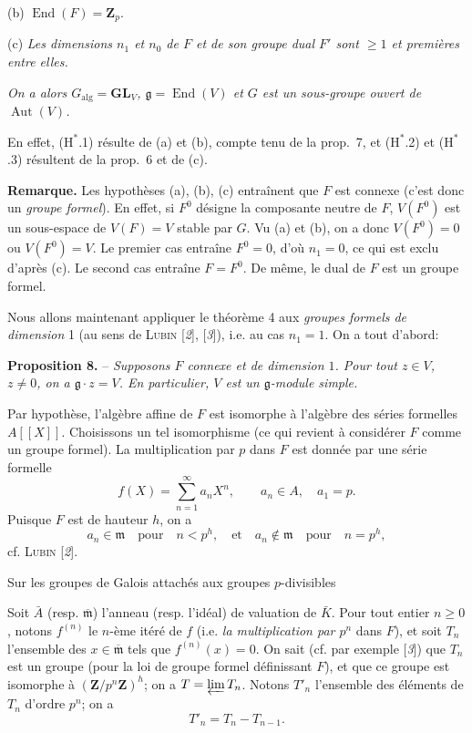 (b) $\operatorname{End}(F)=\mathbf{Z}_p$.

(c) \textit{Les dimensions $n_1$ et $n_0$ de $F$ et de son groupe dual $F'$ sont $\geqslant 1$ et premières entre elles.}

\textit{On a alors $G_{\mathrm{alg}}=\mathbf{GL}_V$, $\mathfrak{g}=\operatorname{End}(V)$ et $G$ est un sous-groupe ouvert de $\operatorname{Aut}(V)$.}

En effet, ($\mathrm{H}^{*}$.1) résulte de (a) et (b), compte tenu de la prop.~7, et ($\mathrm{H}^{*}$.2) et ($\mathrm{H}^{*}$.3) résultent de la prop.~6 et de (c).

\textbf{Remarque.} Les hypothèses (a), (b), (c) entraînent que $F$ est connexe (c’est donc un \textit{groupe formel}). En effet, si $F^0$ désigne la composante neutre de $F$, $V(F^0)$ est un sous-espace de $V(F)=V$ stable par $G$. Vu (a) et (b), on a donc $V(F^0)=0$ ou $V(F^0)=V$. Le premier cas entraîne $F^0=0$, d’où $n_1=0$, ce qui est exclu d’après (c). Le second cas entraîne $F=F^0$.\unsure{-} De même, le dual de $F$ est un groupe formel.

Nous allons maintenant appliquer le théorème 4 aux \textit{groupes formels de dimension} 1 (au sens de \textsc{Lubin} [\textit{2}], [\textit{3}]), i.e. au cas $n_1=1$. On a tout d’abord:

\textbf{Proposition 8.} -- \textit{Supposons $F$ connexe et de dimension $1$. Pour tout $z\in V$, $z\ne0$, on a $\mathfrak{g}\cdot z=V$. En particulier, $V$ est un $\mathfrak{g}$-module simple.}

Par hypothèse, l’algèbre affine de $F$ est isomorphe à l’algèbre des séries formelles $A[[X]]$. Choisissons un tel isomorphisme (ce qui revient à considérer $F$ comme un groupe formel). La multiplication par $p$ dans $F$ est donnée par une série formelle
\[
f(X)=\sum_{n=1}^{\infty}a_nX^n,\qquad a_n\in A,\quad a_1=p.
\]
Puisque $F$ est de hauteur $h$, on a
\[
a_n\in\mathfrak{m}\quad\text{pour}\quad n<p^h,\quad\text{et}\quad a_n\notin\mathfrak{m}\quad\text{pour}\quad n=p^h,
\]
cf. \textsc{Lubin} [\textit{2}].
\begin{center}\small Sur les groupes de Galois attachés aux groupes $p$-divisibles\end{center}
Soit $\bar A$ (resp. $\overline{\mathfrak{m}}$) l’anneau (resp. l’idéal) de valuation de $\bar K$. Pour tout entier $n\geqslant 0$, notons $f^{(n)}$ le $n$-ème itéré de $f$ (i.e. \textit{la multiplication par $p^n$} dans $F$), et soit $T_n$ l’ensemble des $x\in\overline{\mathfrak{m}}$ tels que $f^{(n)}(x)=0$. On sait (cf. par exemple [\textit{3}]) que $T_n$ est un groupe (pour la loi de groupe formel définissant $F$), et que ce groupe est isomorphe à $(\mathbf{Z}/p^n\mathbf{Z})^h$; on a $T=\varprojlim T_n$. Notons $T'_n$ l’ensemble des éléments de $T_n$ d’ordre $p^n$; on a
\[
T'_n=T_n-T_{n-1}.
\]

